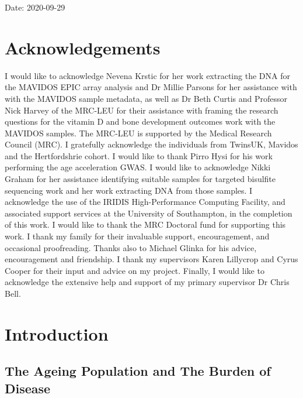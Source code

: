 \documentclass[
]{book}
\begin{document}
Date: 2020-09-29

{
\hypersetup{linkcolor=}
\setcounter{tocdepth}{4}
\tableofcontents
}
\newpage

\hypertarget{acknowledgements}{%
\chapter*{Acknowledgements}\label{acknowledgements}}

I would like to acknowledge Nevena Krstic for her work extracting the DNA for the MAVIDOS EPIC array analysis and Dr Millie Parsons for her assistance with with the MAVIDOS sample metadata, as well as Dr Beth Curtis and Professor Nick Harvey of the MRC-LEU for their assistance with framing the research questions for the vitamin D and bone development outcomes work with the MAVIDOS samples.
The MRC-LEU is supported by the Medical Research Council (MRC).
I gratefully acknowledge the individuals from TwinsUK, Mavidos and the Hertfordshrie cohort.
I would like to thank Pirro Hysi for his work performing the age acceleration GWAS.
I would like to acknowledge Nikki Graham for her assistance identifying suitable samples for targeted bisulfite sequencing work and her work extracting DNA from those samples.
I acknowledge the use of the IRIDIS High-Performance Computing Facility, and associated support services at the University of Southampton, in the completion of this work.
I would like to thank the MRC Doctoral fund for supporting this work.
I thank my family for their invaluable support, encouragement, and occasional proofreading.
Thanks also to Michael Glinka for his advice, encouragement and friendship.
I thank my supervisors Karen Lillycrop and Cyrus Cooper for their input and advice on my project.
Finally, I would like to acknowledge the extensive help and support of my primary supervisor Dr Chris Bell.

\hypertarget{introduction}{%
\chapter{Introduction}\label{introduction}}

\hypertarget{the-ageing-population-and-the-burden-of-disease}{%
\section{The Ageing Population and The Burden of Disease}\label{the-ageing-population-and-the-burden-of-disease}}
\end{document}
